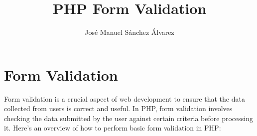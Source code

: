 \documentclass[11pt]{article}
\author{José Manuel Sánchez Álvarez}
\date{}
\title{PHP Form Validation}
\begin{document}
\maketitle
\setcounter{tocdepth}{3}
\tableofcontents

\setlength\parindent{10pt}

\section{Form Validation}
\label{sec:org00e6146}
Form validation is a crucial aspect of web development to ensure that
the data collected from users is correct and useful. In PHP, form
validation involves checking the data submitted by the user against
certain criteria before processing it. Here's an overview of how to
perform basic form validation in PHP:
\end{document}
